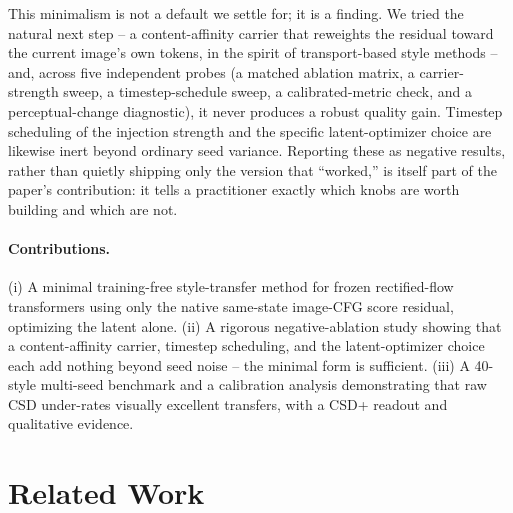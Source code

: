 \documentclass[letterpaper]{article} %
\begin{document}
This minimalism is not a default we settle for; it is a finding. We tried the
natural next step -- a content-affinity carrier that reweights the residual
toward the current image's own tokens, in the spirit of transport-based style
methods -- and, across five independent probes (a matched ablation matrix, a
carrier-strength sweep, a timestep-schedule sweep, a calibrated-metric check,
and a perceptual-change diagnostic), it never produces a robust quality gain.
Timestep scheduling of the injection strength and the specific latent-optimizer
choice are likewise inert beyond ordinary seed variance. Reporting these as
negative results, rather than quietly shipping only the version that
``worked,'' is itself part of the paper's contribution: it tells a practitioner
exactly which knobs are worth building and which are not.

\paragraph{Contributions.} (i) A minimal training-free style-transfer method
for frozen rectified-flow transformers using only the native same-state
image-CFG score residual, optimizing the latent alone. (ii) A rigorous
negative-ablation study showing that a content-affinity carrier, timestep
scheduling, and the latent-optimizer choice each add nothing beyond seed noise
-- the minimal form is sufficient. (iii) A 40-style multi-seed benchmark and a
calibration analysis demonstrating that raw CSD under-rates visually excellent
transfers, with a CSD+ readout and qualitative evidence.

\section{Related Work}
\end{document}

